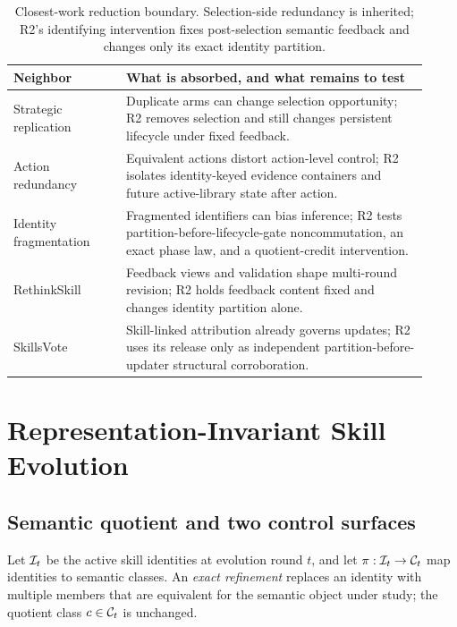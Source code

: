 \begin{table}[t]
\centering
\caption{Closest-work reduction boundary. Selection-side redundancy is inherited; R2's identifying intervention fixes post-selection semantic feedback and changes only its exact identity partition.}
\label{tab:reduction}
\small
\setlength{\tabcolsep}{4pt}
\begin{tabular}{p{0.25\linewidth}p{0.67\linewidth}}
\toprule
Neighbor & What is absorbed, and what remains to test\\
\midrule
Strategic replication~\citep{shin2022replication} & Duplicate arms can change selection opportunity; R2 removes selection and still changes persistent lifecycle under fixed feedback.\\
Action redundancy~\citep{baram2021redundancy} & Equivalent actions distort action-level control; R2 isolates identity-keyed evidence containers and future active-library state after action.\\
Identity fragmentation~\citep{lin2022identityfragmentation} & Fragmented identifiers can bias inference; R2 tests partition-before-lifecycle-gate noncommutation, an exact phase law, and a quotient-credit intervention.\\
RethinkSkill~\citep{liu2026rethinkskill} & Feedback views and validation shape multi-round revision; R2 holds feedback content fixed and changes identity partition alone.\\
SkillsVote~\citep{liu2026skillsvote} & Skill-linked attribution already governs updates; R2 uses its release only as independent partition-before-updater structural corroboration.\\
\bottomrule
\end{tabular}
\end{table}

\section{Representation-Invariant Skill Evolution}

\subsection{Semantic quotient and two control surfaces}

Let $\mathcal{I}_t$ be the active skill identities at evolution round $t$, and let $\pi:\mathcal{I}_t\to\mathcal{C}_t$ map identities to semantic classes. An \emph{exact refinement} replaces an identity with multiple members that are equivalent for the semantic object under study; the quotient class $c\in\mathcal{C}_t$ is unchanged.

